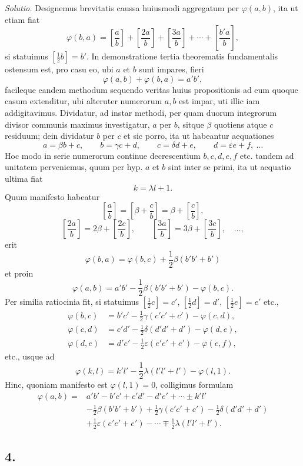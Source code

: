 \documentclass[12pt]{article}
\begin{document}
\emph{Solutio.} Designemus brevitatis caussa huiusmodi aggregatum per $\varphi(a,b)$, ita ut etiam fiat
\[
\varphi(b,a)=\left[\frac{a}{b}\right]+\left[\frac{2a}{b}\right]+\left[\frac{3a}{b}\right]+\cdots+\left[\frac{b'a}{b}\right],
\]
si statuimus $\left[\frac12b\right]=b'$. In demonstratione tertia theorematis fundamentalis ostensum est, pro casu eo, ubi $a$ et $b$ sunt impares, fieri
\[
\varphi(a,b)+\varphi(b,a)=a'b',
\]
facileque eandem methodum sequendo veritas huius propositionis ad eum quoque casum extenditur, ubi alteruter numerorum $a,b$ est impar, uti illic iam addigitavimus. Dividatur, ad instar methodi, per quam duorum integrorum divisor communis maximus investigatur, $a$ per $b$, sitque $\beta$ quotiens atque $c$ residuum; dein dividatur $b$ per $c$ et sic porro, ita ut habeantur aequationes
\[
a=\beta b+c,\qquad b=\gamma c+d,\qquad c=\delta d+e,\qquad d=\varepsilon e+f,\ \ldots
\]
Hoc modo in serie numerorum continue decrescentium $b,c,d,e,f$ etc. tandem ad unitatem perveniemus, quum per hyp. $a$ et $b$ sint inter se primi, ita ut aequatio ultima fiat
\[
k=\lambda l+1.
\]
Quum manifesto habeatur
\[
\left[\frac{a}{b}\right]=\left[\beta+\frac{c}{b}\right]=\beta+\left[\frac{c}{b}\right],
\]
\[
\left[\frac{2a}{b}\right]=2\beta+\left[\frac{2c}{b}\right],\qquad
\left[\frac{3a}{b}\right]=3\beta+\left[\frac{3c}{b}\right],\quad\ldots,
\]
erit
\[
\varphi(b,a)=\varphi(b,c)+\frac12\beta(b'b'+b')
\]
et proin
\[
\varphi(a,b)=a'b'-\frac12\beta(b'b'+b')-\varphi(b,c).
\]
Per similia ratiocinia fit, si statuimus $\left[\frac12c\right]=c'$, $\left[\frac12d\right]=d'$, $\left[\frac12e\right]=e'$ etc.,
\[
\begin{aligned}
\varphi(b,c)&=b'c'-\frac12\gamma(c'c'+c')-\varphi(c,d),\\
\varphi(c,d)&=c'd'-\frac12\delta(d'd'+d')-\varphi(d,e),\\
\varphi(d,e)&=d'e'-\frac12\varepsilon(e'e'+e')-\varphi(e,f),
\end{aligned}
\]
etc., usque ad
\[
\varphi(k,l)=k'l'-\frac12\lambda(l'l'+l')-\varphi(l,1).
\]
Hinc, quoniam manifesto est $\varphi(l,1)=0$, colligimus formulam
\[
\begin{aligned}
\varphi(a,b)= {}& a'b'-b'c'+c'd'-d'e'+\cdots\pm k'l'\\
&-\frac12\beta(b'b'+b')+\frac12\gamma(c'c'+c')-\frac12\delta(d'd'+d')\\
&+\frac12\varepsilon(e'e'+e')-\cdots\mp\frac12\lambda(l'l'+l').
\end{aligned}
\]

\subsection*{4.}
\end{document}
